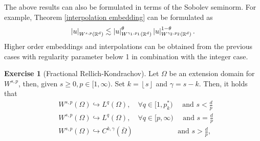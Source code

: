 \documentclass[
    a4paper,
    DIV=14,
    abstract=true,
    numbers=noenddot
]
{scrartcl}
\theoremstyle{definition}
\newtheorem{exercise}{Exercise}
\newcommand{\R}{\mathbb{R}}
\begin{document}
The above results can also be formulated in terms of the Sobolev seminorm. For example, Theorem \ref{interpolation embedding} can be formulated as
\begin{align*}
    \abs{u}_{W^{s, p}(\R^d)} \lesssim \abs{u}_{W^{\gamma_1, p_1}(\R^d)}^\theta\abs{u}_{W^{\gamma_2, p_2}(\R^d)}^{1-\theta}.
\end{align*}
Higher order embeddings and interpolations can be obtained from the previous cases with regularity parameter below 1 in combination with the integer case.

\begin{exercise}[Fractional Rellich-Kondrachov]\label{fractional rellich}
    Let $\Omega $ be an extension domain for $W^{s,p}$, then, given $s \geq 0, p \in [1, \infty)$. Set $k=\left\lfloor s \right\rfloor$ and $\gamma =s-k$. Then, it holds that
    \begin{align*}
         & W^{s, p}(\Omega) \hookrightarrow L^q(\Omega), \quad \forall q \in [1, p_k^*) \quad \text { and } s<\frac{d}{p} \\
         & W^{s, p}(\Omega) \hookrightarrow L^q(\Omega), \quad \forall q \in[p, \infty) \quad \text { and } s=\frac{d}{p} \\
         & W^{s, p}(\Omega) \hookrightarrow C^{k, \gamma}(\bar{\Omega})\hspace{71pt}\text { and } s>\frac{d}{p},
    \end{align*}

\end{exercise}
\end{document}
